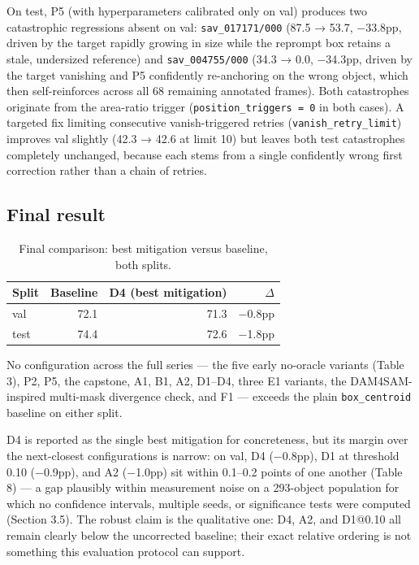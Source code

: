 \documentclass[11pt]{article}
\begin{document}
On test, P5 (with hyperparameters calibrated only on val) produces two catastrophic regressions absent on val: \texttt{sav\_017171/000} (87.5 → 53.7, $-$33.8pp, driven by the target rapidly growing in size while the reprompt box retains a stale, undersized reference) and \texttt{sav\_004755/000} (34.3 → 0.0, $-$34.3pp, driven by the target vanishing and P5 confidently re-anchoring on the wrong object, which then self-reinforces across all 68 remaining annotated frames). Both catastrophes originate from the area-ratio trigger (\texttt{position\_triggers = 0} in both cases). A targeted fix limiting consecutive vanish-triggered retries (\texttt{vanish\_retry\_limit}) improves val slightly (42.3 → 42.6 at limit 10) but leaves both test catastrophes completely unchanged, because each stems from a single confidently wrong first correction rather than a chain of retries.

\subsection{Final result}

\begin{table}[!htbp]
\centering
\caption{Final comparison: best mitigation versus baseline, both splits.}
\label{tab:11}
\begin{tabular}{@{}lrrr@{}}
\toprule
Split & Baseline & D4 (best mitigation) & $\Delta$ \\
\midrule
val & 72.1 & 71.3 & $-$0.8pp \\
test & 74.4 & 72.6 & $-$1.8pp \\
\bottomrule
\end{tabular}
\end{table}

No configuration across the full series — the five early no-oracle variants (Table 3), P2, P5, the capstone, A1, B1, A2, D1–D4, three E1 variants, the DAM4SAM-inspired multi-mask divergence check, and F1 — exceeds the plain \texttt{box\_centroid} baseline on either split.

D4 is reported as the single best mitigation for concreteness, but its margin over the next-closest configurations is narrow: on val, D4 ($-$0.8pp), D1 at threshold 0.10 ($-$0.9pp), and A2 ($-$1.0pp) sit within 0.1–0.2 points of one another (Table 8) — a gap plausibly within measurement noise on a 293-object population for which no confidence intervals, multiple seeds, or significance tests were computed (Section 3.5). The robust claim is the qualitative one: D4, A2, and D1@0.10 all remain clearly below the uncorrected baseline; their exact relative ordering is not something this evaluation protocol can support.
\end{document}
